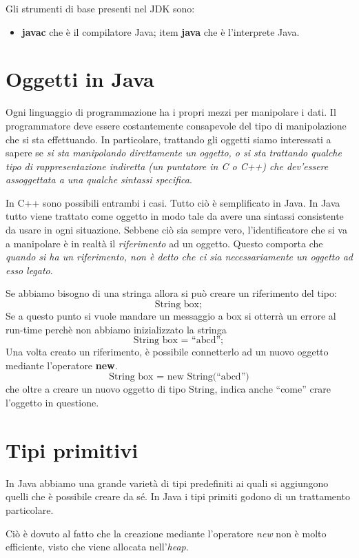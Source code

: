 \documentclass[12pt]{report}
\begin{document}
Gli strumenti di base presenti nel JDK sono:
\begin{itemize}
	\item \textbf{javac} che è il compilatore Java;
	item \textbf{java} che è l'interprete Java.
\end{itemize}
\section{Oggetti in Java}
Ogni linguaggio di programmazione ha i propri mezzi per manipolare i dati. Il programmatore deve essere costantemente consapevole del tipo di manipolazione che si sta effettuando. In particolare, trattando gli oggetti siamo interessati a sapere se \textit{si sta manipolando direttamente un oggetto, o si sta trattando qualche tipo di rappresentazione indiretta (un puntatore in C o C++) che dev'essere assoggettata a una qualche sintassi specifica}.

In C++ sono possibili entrambi i casi. Tutto ciò è semplificato in Java. In Java tutto viene trattato come oggetto in modo tale da avere una sintassi consistente da usare in ogni situazione. Sebbene ciò sia sempre vero, l'identificatore che si va a manipolare è in realtà il \textit{riferimento} ad un oggetto. Questo comporta che \textit{quando si ha un riferimento, non è detto che ci sia necessariamente un oggetto ad esso legato}.
\begin{example}{}{}
Se abbiamo bisogno di una stringa allora si può creare un riferimento del tipo:
\[
\text{String box};
\]
Se a questo punto si vuole mandare un messaggio a box si otterrà un errore al run-time perchè non abbiamo inizializzato la stringa
\[
\text{String box = ``abcd''};
\]
Una volta creato un riferimento, è possibile connetterlo ad un nuovo oggetto mediante l'operatore \textbf{new}.
\[
\text{String box = new String(``abcd'')}
\]
che oltre a creare un nuovo oggetto di tipo String, indica anche ``come'' crare l'oggetto in questione.
\end{example}
\section{Tipi primitivi}
In Java abbiamo una grande varietà di tipi predefiniti ai quali si aggiungono quelli che è possibile creare da sé. In Java i tipi primiti godono di un trattamento particolare.

Ciò è dovuto al fatto che la creazione mediante l'operatore \textit{new} non è molto efficiente, visto che viene allocata nell'\textit{heap}.
\end{document}
